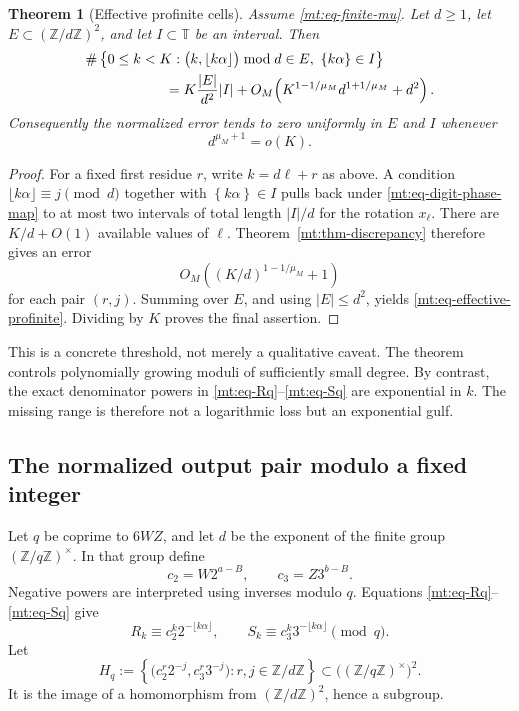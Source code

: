 \documentclass[11pt,oneside]{article}
\newtheorem{theorem}{Theorem}[section]
\theoremstyle{definition}
\theoremstyle{remark}
\newcommand{\Z}{\mathbb Z}
\newcommand{\Torus}{\mathbb T}
\newcommand{\fract}[1]{\left\{#1\right\}}
\begin{document}
\begin{theorem}[Effective profinite cells]
\label{mt:thm-effective-profinite}
Assume \eqref{mt:eq-finite-mu}.  Let $d\ge1$, let
$E\subset(\Z/d\Z)^2$, and let $I\subset\Torus$ be an interval.  Then
\begin{align}
 &\#\left\{0\le k<K:
    \bigl(k,\lfloor k\alpha\rfloor\bigr)\bmod d\in E,
    \ \fract{k\alpha}\in I\right\}
 \notag\\
 &\hspace{2cm}=
 K\frac{|E|}{d^2}|I|
 +O_M\!\left(K^{1-1/\mu_M}d^{1+1/\mu_M}+d^2\right).
 \label{mt:eq-effective-profinite}
\end{align}
Consequently the normalized error tends to zero uniformly in $E$ and $I$ whenever
\begin{equation}
 d^{\mu_M+1}=o(K).
 \label{mt:eq-growing-modulus-range}
\end{equation}
\end{theorem}

\begin{proof}
For a fixed first residue $r$, write $k=d\ell+r$ as above.  A condition
$\lfloor k\alpha\rfloor\equiv j\pmod d$ together with
$\fract{k\alpha}\in I$ pulls back under \eqref{mt:eq-digit-phase-map} to at most two intervals
of total length $|I|/d$ for the rotation $x_\ell$.  There are $K/d+O(1)$ available values of
$\ell$.  Theorem~\ref{mt:thm-discrepancy} therefore gives an error
\[
 O_M\!\left((K/d)^{1-1/\mu_M}+1\right)
\]
for each pair $(r,j)$.  Summing over $E$, and using $|E|\le d^2$, yields
\eqref{mt:eq-effective-profinite}.  Dividing by $K$ proves the final assertion.
\end{proof}

This is a concrete threshold, not merely a qualitative caveat.  The theorem controls
polynomially growing moduli of sufficiently small degree.  By contrast, the exact denominator
powers in \eqref{mt:eq-Rq}--\eqref{mt:eq-Sq} are exponential in $k$.  The missing range is
therefore not a logarithmic loss but an exponential gulf.

\subsection{The normalized output pair modulo a fixed integer}

Let $q$ be coprime to $6WZ$, and let $d$ be the exponent of the finite group
$(\Z/q\Z)^\times$.  In that group define
\begin{equation}
 c_2=W2^{a-B},
 \qquad
 c_3=Z3^{b-B}.
 \label{mt:eq-c2c3}
\end{equation}
Negative powers are interpreted using inverses modulo $q$.  Equations
\eqref{mt:eq-Rq}--\eqref{mt:eq-Sq} give
\begin{equation}
 R_k\equiv c_2^k2^{-\lfloor k\alpha\rfloor},
 \qquad
 S_k\equiv c_3^k3^{-\lfloor k\alpha\rfloor}
 \pmod q.
 \label{mt:eq-RS-modq}
\end{equation}
Let
\begin{equation}
 H_q:=\left\{
   \bigl(c_2^r2^{-j},c_3^r3^{-j}\bigr):
   r,j\in\Z/d\Z
 \right\}
 \subset\bigl((\Z/q\Z)^\times\bigr)^2.
 \label{mt:eq-Hq}
\end{equation}
It is the image of a homomorphism from $(\Z/d\Z)^2$, hence a subgroup.
\end{document}
